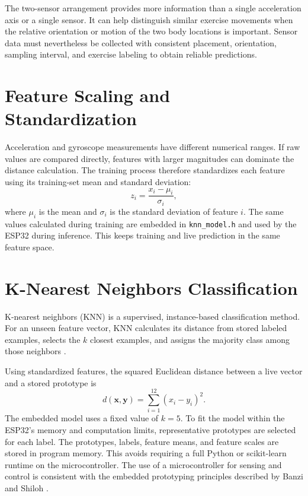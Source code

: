 The two-sensor arrangement provides more information than a single acceleration
axis or a single sensor. It can help distinguish similar exercise movements when the
relative orientation or motion of the two body locations is important. Sensor data
must nevertheless be collected with consistent placement, orientation, sampling
interval, and exercise labeling to obtain reliable predictions.

\section{Feature Scaling and Standardization}
Acceleration and gyroscope measurements have different numerical ranges. If raw
values are compared directly, features with larger magnitudes can dominate the
distance calculation. The training process therefore standardizes each feature using
its training-set mean and standard deviation:
\begin{equation}
z_i = \frac{x_i-\mu_i}{\sigma_i},
\end{equation}
where $\mu_i$ is the mean and $\sigma_i$ is the standard deviation of feature $i$.
The same values calculated during training are embedded in \texttt{knn\_model.h} and
used by the ESP32 during inference. This keeps training and live prediction in the
same feature space.

\section{K-Nearest Neighbors Classification}
K-nearest neighbors (KNN) is a supervised, instance-based classification method.
For an unseen feature vector, KNN calculates its distance from stored labeled
examples, selects the $k$ closest examples, and assigns the majority class among
those neighbors \cite{geron2022hands}.

Using standardized features, the squared Euclidean distance between a live vector
and a stored prototype is
\begin{equation}
d(\mathbf{x},\mathbf{y}) = \sum_{i=1}^{12}(x_i-y_i)^2.
\end{equation}
The embedded model uses a fixed value of $k=5$. To fit the model within the ESP32's
memory and computation limits, representative prototypes are selected for each
label. The prototypes, labels, feature means, and feature scales are stored in
program memory. This avoids requiring a full Python or scikit-learn runtime on the
microcontroller. The use of a microcontroller for sensing and control is consistent
with the embedded prototyping principles described by Banzi and Shiloh
\cite{banzi2022arduino}.

